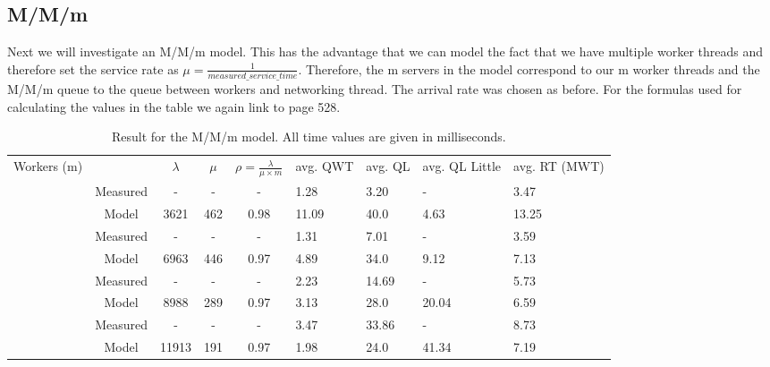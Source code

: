 \documentclass[11pt,a4paper]{article}
\begin{document}
\subsection{M/M/m}
Next we will investigate an M/M/m model. This has the advantage that we can model the fact that we have multiple worker threads and therefore set the service rate as $\mu = \frac{1}{measured\_service\_time}$. Therefore, the m servers in the model correspond to our m worker threads and the M/M/m queue to the queue between workers and networking thread. The arrival rate was chosen as before. For the formulas used for calculating the values in the table we again link to \cite{performance_book} page 528. 
\begin{table}[H]
    \centering
    \begin{tabular}{|c|c|c|c|c|p{1.2cm}|p{1.4cm}|p{1.4cm}|p{1.4cm}|} \hline
          Workers (m) &         & $\lambda$ & $\mu$   & $\rho = \frac{\lambda}{\mu \times m}$ & avg. QWT   & avg. QL   &  avg. QL Little & avg. RT (MWT)  \\ \Xhline{4\arrayrulewidth}
      \multirow{2}{*}{8} &   Measured &     -    &     -        &   -                       &  1.28    &  3.20      &  -                & 3.47 \\\cline{2-9}
      &   Model    &  3621    &   462 &       0.98  & 11.09   & 40.0  &  4.63    & 13.25 \\ \Xhline{3\arrayrulewidth}
         
     \multirow{2}{*}{16} &    Measured &   -      &     -       &   -                   &    1.31       &    7.01           &      -             &    3.59    \\ \cline{2-9}
       &  Model    &   6963     & 446   &  0.97   & 4.89  & 34.0   &  9.12   &   7.13  \\ \Xhline{3\arrayrulewidth}
         
      \multirow{2}{*}{32} &   Measured &   -      &     -       &   -                   &    2.23       &      14.69         &      -             &   5.73    \\ \cline{2-9}
      &   Model    &   8988    &  289  &   0.97  & 3.13  &  28.0   & 20.04  &   6.59   \\ \Xhline{3\arrayrulewidth}
         
      \multirow{2}{*}{64} &   Measured &   -      &     -       &   -                   &     3.47      &     33.86          &      -             &    8.73   \\ \cline{2-9}
     &    Model    &   11913    & 191   &  0.97   &  1.98 & 24.0  &  41.34     &    7.19  \\ \hline
    \end{tabular}
    \caption{Result for the M/M/m model. All time values are given in milliseconds.}
    \label{tab:queuein:mmm}
\end{table}
\end{document}
